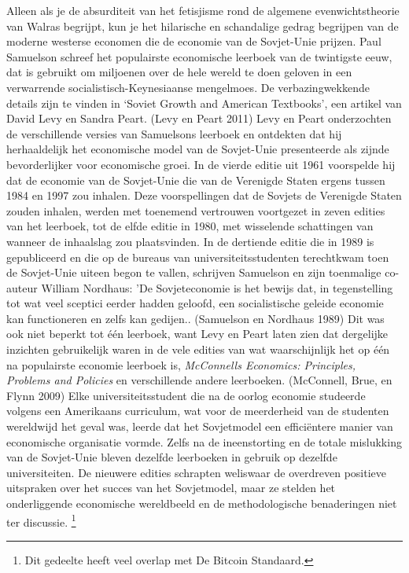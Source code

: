 \documentclass[
  a5paper,
  smalldemyvopaper,11pt,twoside,onecolumn,openright,extrafontsizes,
hidelinks]{memoir}
\begin{document}
Alleen als je de absurditeit van het fetisjisme rond de algemene
evenwichtstheorie van Walras begrijpt, kun je het hilarische en
schandalige gedrag begrijpen van de moderne westerse economen die de
economie van de Sovjet-Unie prijzen. Paul Samuelson schreef het
populairste economische leerboek van de twintigste eeuw, dat is gebruikt
om miljoenen over de hele wereld te doen geloven in een verwarrende
socialistisch-Keynesiaanse mengelmoes. De verbazingwekkende details zijn
te vinden in `Soviet Growth and American Textbooks', een artikel van
David Levy en Sandra Peart. (Levy en Peart 2011) Levy en Peart
onderzochten de verschillende versies van Samuelsons leerboek en
ontdekten dat hij herhaaldelijk het economische model van de Sovjet-Unie
presenteerde als zijnde bevorderlijker voor economische groei. In de
vierde editie uit 1961 voorspelde hij dat de economie van de Sovjet-Unie
die van de Verenigde Staten ergens tussen 1984 en 1997 zou inhalen. Deze
voorspellingen dat de Sovjets de Verenigde Staten zouden inhalen, werden
met toenemend vertrouwen voortgezet in zeven edities van het leerboek,
tot de elfde editie in 1980, met wisselende schattingen van wanneer de
inhaalslag zou plaatsvinden. In de dertiende editie die in 1989 is
gepubliceerd en die op de bureaus van universiteitsstudenten terechtkwam
toen de Sovjet-Unie uiteen begon te vallen, schrijven Samuelson en zijn
toenmalige co-auteur William Nordhaus: 'De Sovjeteconomie is het bewijs
dat, in tegenstelling tot wat veel sceptici eerder hadden geloofd, een
socialistische geleide economie kan functioneren en zelfs kan gedijen..
(Samuelson en Nordhaus 1989) Dit was ook niet beperkt tot één leerboek,
want Levy en Peart laten zien dat dergelijke inzichten gebruikelijk
waren in de vele edities van wat waarschijnlijk het op één na
populairste economie leerboek is, \emph{McConnells Economics:
Principles, Problems and Policies} en verschillende andere leerboeken.
(McConnell, Brue, en Flynn 2009) Elke universiteitsstudent die na de
oorlog economie studeerde volgens een Amerikaans curriculum, wat voor de
meerderheid van de studenten wereldwijd het geval was, leerde dat het
Sovjetmodel een efficiëntere manier van economische organisatie vormde.
Zelfs na de ineenstorting en de totale mislukking van de Sovjet-Unie
bleven dezelfde leerboeken in gebruik op dezelfde universiteiten. De
nieuwere edities schrapten weliswaar de overdreven positieve uitspraken
over het succes van het Sovjetmodel, maar ze stelden het onderliggende
economische wereldbeeld en de methodologische benaderingen niet ter
discussie. \footnote{Dit gedeelte heeft veel overlap met De Bitcoin
  Standaard.}
\end{document}
